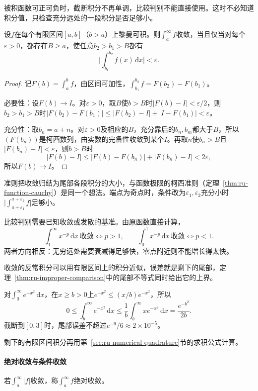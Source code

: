被积函数可正可负时，截断积分不再单调，比较判别不能直接使用。这时不必知道积分值，只检查充分远处的一段积分是否足够小。
\begin{theorem}[反常积分的柯西准则]
\label{thm:ru-improper-cauchy}
设$f$在每个有限区间$[a,b]$（$b>a$）上黎曼可积。则$\int_a^\infty f$收敛，当且仅当对每个$\varepsilon>0$，都存在$B\geq a$，使任意$b_2>b_1>B$都有
\[
 \biggl|\int_{b_1}^{b_2}f(x)\,\mathrm dx\biggr|<\varepsilon.
\]
\end{theorem}
\begin{proof}
记$F(b)=\int_a^bf$，由区间可加性，$\int_{b_1}^{b_2}f=F(b_2)-F(b_1)$。

必要性：设$F(b)\to I$。对$\varepsilon>0$，取$B$使$b>B$时$|F(b)-I|<\varepsilon/2$，则$b_2>b_1>B$时$|F(b_2)-F(b_1)|\leq|F(b_2)-I|+|I-F(b_1)|<\varepsilon$。

充分性：取$b_n=a+n$。对$\varepsilon>0$及相应的$B$，充分靠后的$b_n,b_m$都大于$B$，所以$(F(b_n))$是柯西数列，由实数的完备性收敛到某个$I$。再取$n$使$b_n>B$且$|F(b_n)-I|<\varepsilon$，则$b>B$时
\[
 |F(b)-I|\leq|F(b)-F(b_n)|+|F(b_n)-I|<2\varepsilon,
\]
所以$F(b)\to I$。
\end{proof}
准则把收敛归结为尾部各段积分的大小，与函数极限的柯西准则（定理~\ref{thm:ru-function-cauchy}）是同一个想法。端点为奇点时，条件改为$\varepsilon_1,\varepsilon_2$充分小时$\bigl|\int_{a+\varepsilon_1}^{a+\varepsilon_2}f\bigr|$足够小。

比较判别需要已知收敛或发散的基准。由原函数直接计算，
\[
 \int_1^\infty x^{-p}\,\mathrm dx\ \text{收敛}\iff p>1,\qquad\int_0^1x^{-p}\,\mathrm dx\ \text{收敛}\iff p<1.
\]
两者方向相反：无穷远处需要衰减得足够快，零点附近则不能增长得太快。

收敛的反常积分可以用有限区间上的积分近似，误差就是剩下的尾部，定理~\ref{thm:ru-improper-comparison}中的尾部不等式同时给出它的上界。
\begin{example}[$e^{-x^2}$的尾部截断误差]
\label{ex:ru-gaussian-tail-truncation}
对$\int_0^\infty e^{-x^2}\,\mathrm dx$，在$x\geq b>0$上$e^{-x^2}\leq(x/b)e^{-x^2}$，所以
\[
 0\leq\int_b^\infty e^{-x^2}\,\mathrm dx\leq\frac1b\int_b^\infty xe^{-x^2}\,\mathrm dx=\frac{e^{-b^2}}{2b}.
\]
截断到$[0,3]$时，尾部误差不超过$e^{-9}/6\approx2\times10^{-5}$。
\end{example}
剩下的有限区间积分再用第~\ref{sec:ru-numerical-quadrature}节的求积公式计算。

\paragraph{绝对收敛与条件收敛}
若$\int_a^\infty|f|$收敛，称$\int_a^\infty f$绝对收敛。

